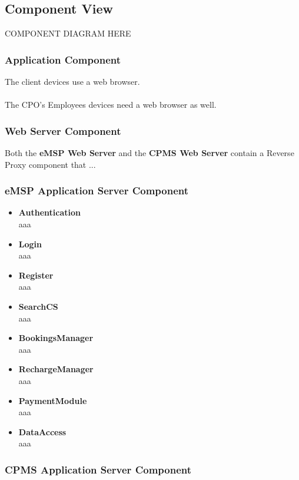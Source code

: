 \documentclass[11pt]{article}
\begin{document}
\subsection{Component View}

COMPONENT DIAGRAM HERE

\subsubsection{Application Component}

The client devices use a web browser. \\
\\
The CPO's Employees devices need a web browser as well.

\subsubsection{Web Server Component}

Both the \textbf{eMSP Web Server} and the \textbf{CPMS Web Server} contain a Reverse Proxy component that ... 

\subsubsection{eMSP Application Server Component}

\begin{itemize}
    \item \textbf{Authentication} \\
        aaa
    \item \textbf{Login} \\
        aaa
    \item \textbf{Register} \\
        aaa
    \item \textbf{SearchCS} \\
        aaa
    \item \textbf{BookingsManager} \\
        aaa
    \item \textbf{RechargeManager} \\
        aaa
    \item \textbf{PaymentModule} \\
        aaa
    \item \textbf{DataAccess} \\
        aaa
\end{itemize}

\subsubsection{CPMS Application Server Component}
\end{document}
